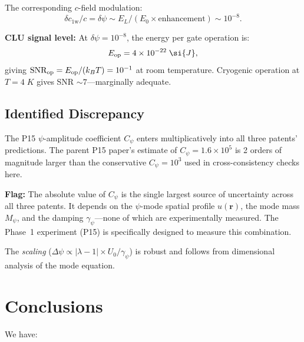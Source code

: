 \documentclass[aps,prd,twocolumn,superscriptaddress,nofootinbib,floatfix]{revtex4-2}
\newcommand{\cfield}{c_{\text{1w}}}
\newcommand{\cvac}{c}
\newcommand{\ee}[1]{\times 10^{#1}}
\begin{document}
The corresponding $c$-field modulation:
\begin{equation}
\delta\cfield/\cvac = \delta\psi \sim E_L/(E_0\times\text{enhancement}) \sim 10^{-8}.
\end{equation}

\textbf{CLU signal level:} At $\delta\psi = 10^{-8}$, the energy
per gate operation is:
\begin{equation}
E_{\rm op} = 4\ee{-22}\;\si{J},
\end{equation}
giving $\text{SNR}_{\rm op} = E_{\rm op}/(k_BT) = 10^{-1}$ at room temperature.
Cryogenic operation at $T = 4\;\si{K}$ gives SNR $\sim 7$---marginally adequate.

\subsection{Identified Discrepancy}

The P15 $\psi$-amplitude coefficient $C_\psi$ enters multiplicatively
into all three patents' predictions.  The parent P15 paper's
estimate of $C_\psi = 1.6\ee{5}$ is 2 orders of magnitude
larger than the conservative $C_\psi = 10^3$ used in
cross-consistency checks here.

\textbf{Flag:} The absolute value of $C_\psi$ is the single
largest source of uncertainty across all three patents.
It depends on the $\psi$-mode spatial profile $u(\mathbf{r})$,
the mode mass $M_\psi$, and the damping $\gamma_\psi$---none
of which are experimentally measured.  The Phase~1 experiment
(P15) is specifically designed to measure this combination.

The \emph{scaling} ($\Delta\psi \propto |\lambda-1| \times U_0 / \gamma_\psi$)
is robust and follows from dimensional analysis of the mode equation.

\section{Conclusions}
\label{sec:conclusions}

We have:
\end{document}
